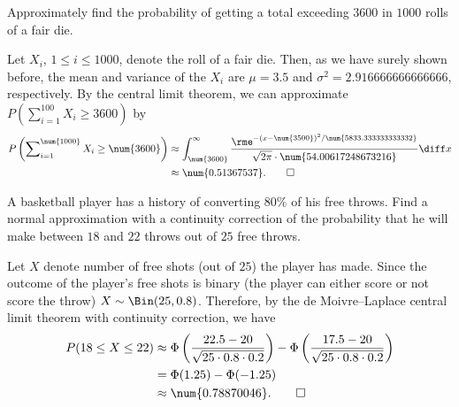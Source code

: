 \begin{problem}[Handout 14, \# 5]
  Approximately find the probability of getting a total exceeding
  \(\num{3600}\) in \(\num{1000}\) rolls of a fair die.
\end{problem}
\begin{solution}
  Let \(X_i\), \(1\leq i\leq\num{1000}\), denote the roll of a fair
  die. Then, as we have surely shown before, the mean and variance of the
  \(X_i\) are \(\mu=3.5\) and \(\sigma^2=\num{2.916666666666666}\),
  respectively. By the central limit theorem, we can approximate
  \(P(\sum_{i=1}^{100}X_i\geq\num{3600})\) by
  \begin{align*}
    P\left(\sum\nolimits_{i=1}^{\num{1000}}X_i\geq\num{3600}\right)
    &\approx\int_{\num{3600}}^\infty
      \frac{\rme^{-(x-\num{3500})^2/\num{5833.333333333332}}}
      {\sqrt{2\pi}\cdot\num{54.00617248673216}}\diff x\\
    &\approx\num{0.51367537}.\qedhere
  \end{align*}
\end{solution}
\newpage

\begin{problem}[Handout 14, \# 6]
  A basketball player has a history of converting \(80\%\) of his free
  throws. Find a normal approximation with a continuity correction of the
  probability that he will make between \(18\) and \(22\) throws out of
  \(25\) free throws.
\end{problem}
\begin{solution}
  Let \(X\) denote number of free shots (out of \(25\)) the player has
  made. Since the outcome of the player's free shots is binary (the player
  can either score or not score the throw)
  \(X\sim\Bin(25,0.8)\). Therefore, by the de Moivre--Laplace central limit
  theorem with continuity correction, we have
  \begin{align*}
    P(18\leq X\leq 22)
    &\approx\Phi\left(\frac{22.5-20}{\sqrt{25\cdot 0.8\cdot 0.2}}\right)
      -\Phi\left(\frac{17.5-20}{\sqrt{25\cdot 0.8\cdot 0.2}}\right)\\
    &=\Phi(1.25)-\Phi(-1.25)\\
    &\approx\num{0.78870046}.\qedhere
  \end{align*}
\end{solution}
\newpage


